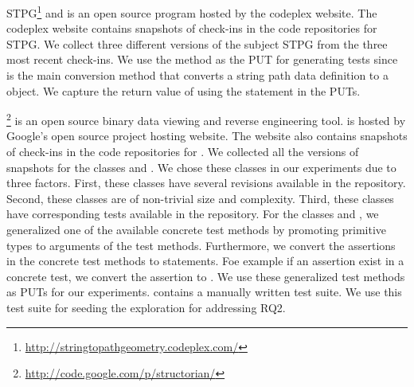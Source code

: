 
STPG\footnote{\url{http://stringtopathgeometry.codeplex.com/}} and is an open source program hosted by the codeplex website. The codeplex website contains snapshots of check-ins in the code repositories for STPG. We collect three different versions of the subject STPG from the three most recent check-ins. We use the  method as the PUT for generating tests since  is the main conversion method that converts a string path data definition to a  object. We capture the return value of  using the  statement in the PUTs.


\footnote{\url{http://code.google.com/p/structorian/}} is an open source binary data viewing and reverse engineering tool.  is hosted by Google's open source project hosting website. The website also contains snapshots of check-ins in the code repositories for . We collected all the versions of snapshots for the classes  and . We chose these classes in our experiments due to three factors. First, these classes have several revisions available in the repository. Second, these classes are of non-trivial size and complexity. Third, these classes have corresponding tests available in the repository. For the classes  and  , we generalized one of the available concrete test methods by promoting primitive types to arguments of the test methods. 
Furthermore, we convert the assertions in the concrete test methods to  statements.
Foe example if an assertion  exist in a concrete test, we convert the assertion to
.
We use these generalized test methods as PUTs for our experiments.  contains a manually written test suite. We use this test suite for seeding the exploration for addressing RQ2.

